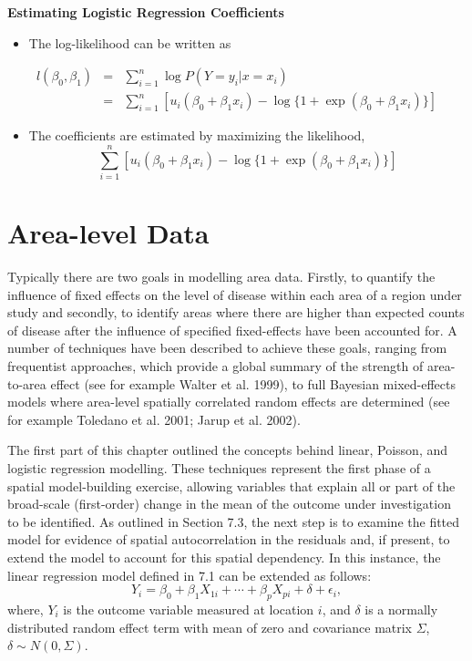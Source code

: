 \documentclass[]{book}
\providecommand{\tightlist}{%
  \setlength{\itemsep}{0pt}\setlength{\parskip}{0pt}}
\begin{document}
\textbf{Estimating Logistic Regression Coefficients}

\begin{itemize}
\tightlist
\item
  The log-likelihood can be written as
\end{itemize}

\begin{eqnarray*}
l(\beta_0,\beta_1)&=&\sum_{i=1}^{n}\log{P(Y=y_{i}|x=x_{i})}\\
&=&\sum_{i=1}^{n}[u_{i}(\beta_0+ \beta_1 x_{i})-\log{\{1+\exp(\beta_0+ \beta_1 x_{i})\}}]
\end{eqnarray*}

\begin{itemize}
\tightlist
\item
  The coefficients are estimated by maximizing the likelihood, \[
  \sum_{i=1}^{n}[u_{i}(\beta_0+ \beta_1 x_{i})-\log{\{1+\exp(\beta_0+ \beta_1 x_{i})\}}]
  \]
\end{itemize}

\section{Area-level Data}\label{area-level-data}

Typically there are two goals in modelling area data. Firstly, to
quantify the influence of fixed effects on the level of disease within
each area of a region under study and secondly, to identify areas where
there are higher than expected counts of disease after the influence of
specified fixed-effects have been accounted for. A number of techniques
have been described to achieve these goals, ranging from frequentist
approaches, which provide a global summary of the strength of
area-to-area effect (see for example Walter et al. 1999), to full
Bayesian mixed-effects models where area-level spatially correlated
random effects are determined (see for example Toledano et al. 2001;
Jarup et al. 2002).

The first part of this chapter outlined the concepts behind linear,
Poisson, and logistic regression modelling. These techniques represent
the first phase of a spatial model-building exercise, allowing variables
that explain all or part of the broad-scale (first-order) change in the
mean of the outcome under investigation to be identified. As outlined in
Section 7.3, the next step is to examine the fitted model for evidence
of spatial autocorrelation in the residuals and, if present, to extend
the model to account for this spatial dependency. In this instance, the
linear regression model defined in 7.1 can be extended as follows: \[
Y_i=\beta_0 + \beta_1X_{1i} +\cdots +\beta_pX_{pi} + \delta + \epsilon_i,
\] where, \(Y_i\) is the outcome variable measured at location \(i\),
and \(\delta\) is a normally distributed random effect term with mean of
zero and covariance matrix \(\Sigma\), \(\delta \sim N(0, \Sigma)\).
\end{document}
